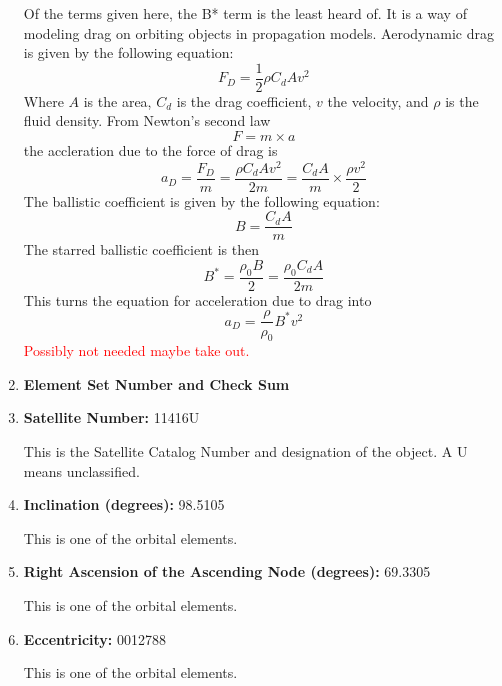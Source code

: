 \documentclass[12pt]{article}
\begin{document}
\begin{enumerate}
		Of the terms given here, the B* term is the least heard of. It is a way of modeling drag on orbiting objects in propagation models.  
		Aerodynamic drag is given by the following equation:
		\begin{equation}
		F_D = \frac{1}{2}\rho C_d A v^2
		\end{equation}
		Where $A$ is the area, $C_d$ is the drag coefficient, $v$ the velocity, and $\rho$ is the fluid density. From Newton's second law
		\begin{equation}
		F = m\times a
		\end{equation}
		the accleration due to the force of drag is 
		\begin{equation}
		a_D=\frac{F_D}{m}=\frac{\rho C_d A v^2}{2m}=\frac{ C_d A}{m}\times\frac{\rho v^2}{2}
		\end{equation}
		The ballistic coefficient is given by the following equation:
		\begin{equation}
		B=\frac{ C_d A}{m}
		\end{equation}
		The starred ballistic coefficient is then
		\begin{equation}
		B^{*} = \frac{\rho_0 B}{2}=\frac{\rho_0 C_d A}{2m}
		\end{equation}
		This turns the equation for acceleration due to drag into \cite{celestrak_TLE_FAQ}\cite{castor2_BSTAR}
		\begin{equation}
		a_D=\frac{\rho}{\rho_0}B^{*} v^2
		\end{equation}
		\textcolor{red}{Possibly not needed maybe take out. }\par 
		\item \textbf{Element Set Number and Check Sum}
		
		\item \textbf{Satellite Number: } 11416U
		
		This is the Satellite Catalog Number and designation of the object. A U means unclassified. 
		
		\item \textbf{Inclination (degrees): }98.5105
		
		This is one of the orbital elements.
		\item \textbf{Right Ascension of the Ascending Node (degrees): }69.3305
		
		This is one of the orbital elements.
		
		\item \textbf{Eccentricity: } 0012788
		
		This is one of the orbital elements.
		

\end{enumerate}
\end{document}
